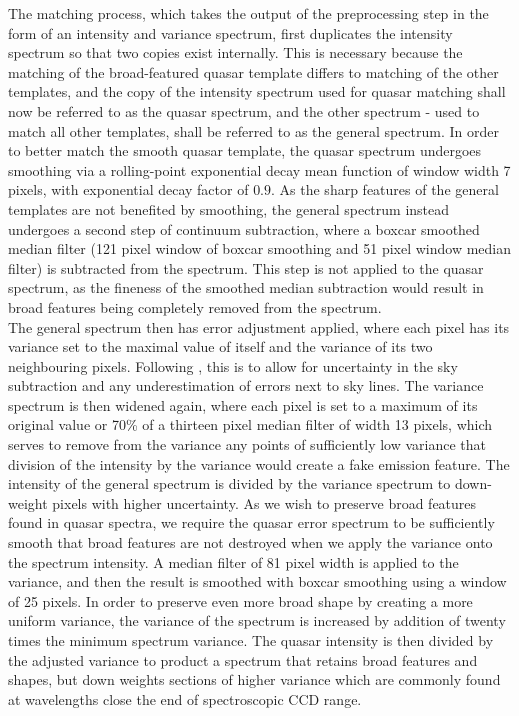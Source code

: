 \documentclass[iop]{emulateapj}
\begin{document}
The matching process, which takes the output of the preprocessing step in the form of an intensity and variance spectrum, first duplicates the intensity spectrum so that two copies exist internally. This is necessary because the matching of the broad-featured quasar template differs to matching of the other templates, and the copy of the intensity spectrum used for quasar matching shall now be referred to as the quasar spectrum, and the other spectrum - used to match all other templates, shall be referred to as the general spectrum. In order to better match the smooth quasar template, the quasar spectrum undergoes smoothing via a rolling-point exponential decay mean function of window width 7 pixels, with exponential decay factor of $0.9$. As the sharp features of the general templates are not benefited by smoothing, the general spectrum instead undergoes a second step of continuum subtraction, where a boxcar smoothed median filter (121 pixel window of boxcar smoothing and 51 pixel window median filter) is subtracted from the spectrum. This step is not applied to the quasar spectrum, as the fineness of the smoothed median subtraction would result in broad features being completely removed from the spectrum. \\

The general spectrum then has error adjustment applied, where each pixel has its variance set to the maximal value of itself and the variance of its two neighbouring pixels. Following \citet{baldry2014galaxy}, this is to allow for uncertainty in the sky subtraction and any underestimation of errors next to sky lines. The variance spectrum is then widened again, where each pixel is set to a maximum of its original value or 70\% of a thirteen pixel median filter of width 13 pixels, which serves to remove from the variance any points of sufficiently low variance that division of the intensity by the variance would create a fake emission feature. The intensity of the general spectrum is divided by the variance spectrum to down-weight pixels with higher uncertainty. As we wish to preserve broad features found in quasar spectra, we require the quasar error spectrum to be sufficiently smooth that broad features are not destroyed when we apply the variance onto the spectrum intensity. A median filter of 81 pixel width is applied to the variance, and then the result is smoothed with boxcar smoothing using a window of 25 pixels. In order to preserve even more broad shape by creating a more uniform variance, the variance of the spectrum is increased by addition of twenty times the minimum spectrum variance. The quasar intensity is then divided by the adjusted variance to product a spectrum that retains broad features and shapes, but down weights sections of higher variance which are commonly found at wavelengths close the end of spectroscopic CCD range.\\
\end{document}
